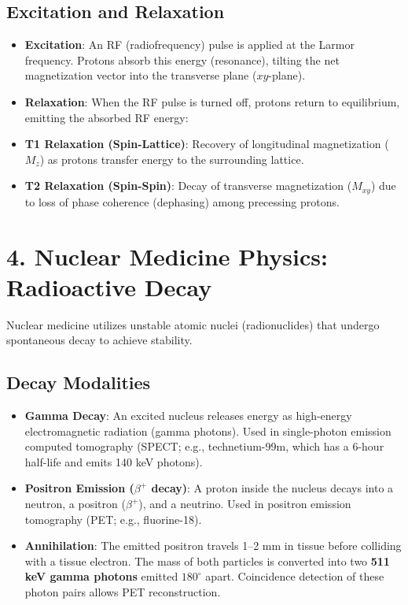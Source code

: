\subsection*{Excitation and Relaxation}
\begin{itemize}
    \item \textbf{Excitation}: An RF (radiofrequency) pulse is applied at the Larmor frequency. Protons absorb this energy (resonance), tilting the net magnetization vector into the transverse plane ($xy$-plane).
    \item \textbf{Relaxation}: When the RF pulse is turned off, protons return to equilibrium, emitting the absorbed RF energy:
    \item \textbf{T1 Relaxation (Spin-Lattice)}: Recovery of longitudinal magnetization ($M_z$) as protons transfer energy to the surrounding lattice.
    \item \textbf{T2 Relaxation (Spin-Spin)}: Decay of transverse magnetization ($M_{xy}$) due to loss of phase coherence (dephasing) among precessing protons.
\end{itemize}


\section*{4. Nuclear Medicine Physics: Radioactive Decay}
Nuclear medicine utilizes unstable atomic nuclei (radionuclides) that undergo spontaneous decay to achieve stability.

\subsection*{Decay Modalities}
\begin{itemize}
    \item \textbf{Gamma Decay}: An excited nucleus releases energy as high-energy electromagnetic radiation (gamma photons). Used in single-photon emission computed tomography (SPECT; e.g., technetium-99m, which has a 6-hour half-life and emits 140 keV photons).
    \item \textbf{Positron Emission ($\beta^+$ decay)}: A proton inside the nucleus decays into a neutron, a positron ($\beta^+$), and a neutrino. Used in positron emission tomography (PET; e.g., fluorine-18).
    \item \textbf{Annihilation}: The emitted positron travels 1--2 mm in tissue before colliding with a tissue electron. The mass of both particles is converted into two \textbf{511 keV gamma photons} emitted $180^\circ$ apart. Coincidence detection of these photon pairs allows PET reconstruction.
\end{itemize}

\clearpage
